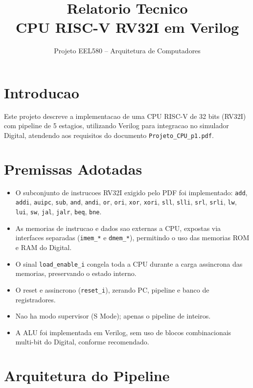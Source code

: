 \documentclass[12pt,a4paper]{article}
\title{Relatorio Tecnico \\ CPU RISC-V RV32I em Verilog}
\author{Projeto EEL580 -- Arquitetura de Computadores}
\date{}
\begin{document}
\maketitle
\tableofcontents
\newpage

\section{Introducao}

Este projeto descreve a implementacao de uma CPU RISC-V de 32 bits (RV32I) com
pipeline de 5 estagios, utilizando Verilog para integracao no simulador Digital,
atendendo aos requisitos do documento \texttt{Projeto\_CPU\_p1.pdf}.

\section{Premissas Adotadas}

\begin{itemize}
    \item O subconjunto de instrucoes RV32I exigido pelo PDF foi implementado:
          \texttt{add}, \texttt{addi}, \texttt{auipc}, \texttt{sub},
          \texttt{and}, \texttt{andi}, \texttt{or}, \texttt{ori},
          \texttt{xor}, \texttt{xori}, \texttt{sll}, \texttt{slli},
          \texttt{srl}, \texttt{srli}, \texttt{lw}, \texttt{lui},
          \texttt{sw}, \texttt{jal}, \texttt{jalr}, \texttt{beq}, \texttt{bne}.
    \item As memorias de instrucao e dados sao externas a CPU, expostas via
          interfaces separadas (\texttt{imem\_*} e \texttt{dmem\_*}),
          permitindo o uso das memorias ROM e RAM do Digital.
    \item O sinal \texttt{load\_enable\_i} congela toda a CPU durante a carga
          assincrona das memorias, preservando o estado interno.
    \item O reset e assincrono (\texttt{reset\_i}), zerando PC, pipeline e
          banco de registradores.
    \item Nao ha modo supervisor (S Mode); apenas o pipeline de inteiros.
    \item A ALU foi implementada em Verilog, sem uso de blocos combinacionais
          multi-bit do Digital, conforme recomendado.
\end{itemize}

\section{Arquitetura do Pipeline}
\end{document}

